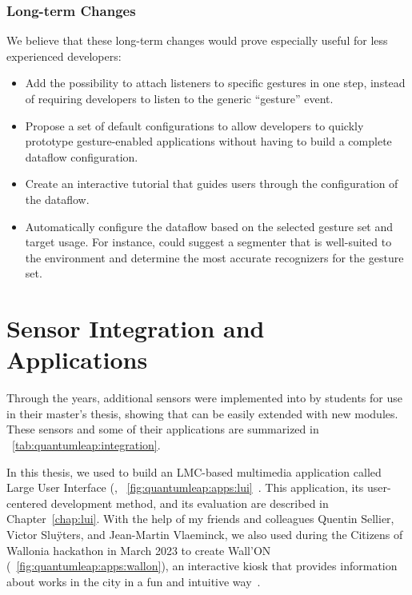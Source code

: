 \subsubsection{Long-term Changes} 
We believe that these long-term changes would prove especially useful for less experienced developers:
\begin{itemize}
    \item Add the possibility to attach listeners to specific gestures in one step, instead of requiring developers to listen to the generic ``gesture'' event.
    \item Propose a set of default configurations to allow developers to quickly prototype gesture-enabled applications without having to build a complete dataflow configuration.
    \item Create an interactive tutorial that guides users through the configuration of the \ql dataflow.
    \item Automatically configure the dataflow based on the selected gesture set and target usage. For instance, \ql could suggest a segmenter that is well-suited to the environment and determine the most accurate recognizers for the gesture set.
\end{itemize}


\section{Sensor Integration and Applications} \label{sec:quantumleap:integration}
Through the years, additional sensors were implemented into \ql by students for use in their master's thesis, showing that \ql can be easily extended with new modules. These sensors and some of their applications are summarized in \tab~\ref{tab:quantumleap:integration}.

In this thesis, we used \ql to build an LMC-based multimedia application called Large User Interface (\lui, \fig~\ref{fig:quantumleap:apps:lui}~\cite{Sluyters:2022:LUI}. This application, its user-centered development method, and its evaluation are described in Chapter~\ref{chap:lui}.
%
With the help of my friends and colleagues Quentin Sellier, Victor Sluÿters, and Jean-Martin Vlaeminck, we also used \ql during the Citizens of Wallonia hackathon in March 2023 to create Wall'ON (\fig~\ref{fig:quantumleap:apps:wallon}), an interactive kiosk that provides information about works in the city in a fun and intuitive way~\cite{Rawart:2023}.

